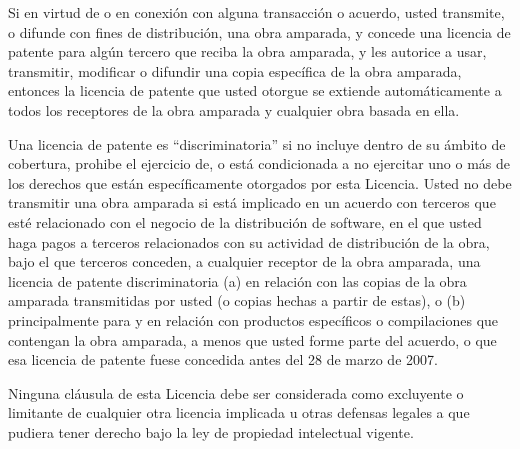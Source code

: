 \documentclass[11pt]{article}
\begin{document}
\begin{enumerate}
Si en virtud de o en conexi\'{o}n con alguna transacci\'{o}n o acuerdo, usted 
transmite, o difunde con fines de distribuci\'{o}n, una obra amparada, y 
concede una licencia de patente para alg\'{u}n tercero que reciba la obra 
amparada, y les autorice a usar, transmitir, modificar o difundir una copia 
espec\'{i}fica de la obra amparada, entonces la licencia de patente que usted 
otorgue se extiende automáticamente a todos los receptores de la obra 
amparada y cualquier obra basada en ella.


Una licencia de patente es ``discriminatoria'' si no incluye dentro de su 
ámbito de cobertura, prohibe el ejercicio de, o está condicionada a no 
ejercitar uno o más de los derechos que están espec\'{i}ficamente otorgados por 
esta Licencia. Usted no debe transmitir una obra amparada si está implicado 
en un acuerdo con terceros que est\'{e} relacionado con el negocio de la 
distribuci\'{o}n de software, en el que usted haga pagos a terceros relacionados 
con su actividad de distribuci\'{o}n de la obra, bajo el que terceros conceden, 
a cualquier receptor de la obra amparada, una licencia de patente 
discriminatoria (a) en relaci\'{o}n con las copias de la obra amparada 
transmitidas por usted (o copias hechas a partir de estas), o 
(b) principalmente para y en relaci\'{o}n con productos espec\'{i}ficos o 
compilaciones que contengan la obra amparada, a menos que usted forme parte 
del acuerdo, o que esa licencia de patente fuese concedida antes del 28 de 
marzo de 2007.

Ninguna cláusula de esta Licencia debe ser considerada como excluyente 
o limitante de cualquier otra licencia implicada u otras defensas legales 
a que pudiera tener derecho bajo la ley de propiedad intelectual vigente.
\end{enumerate}
\end{document}
